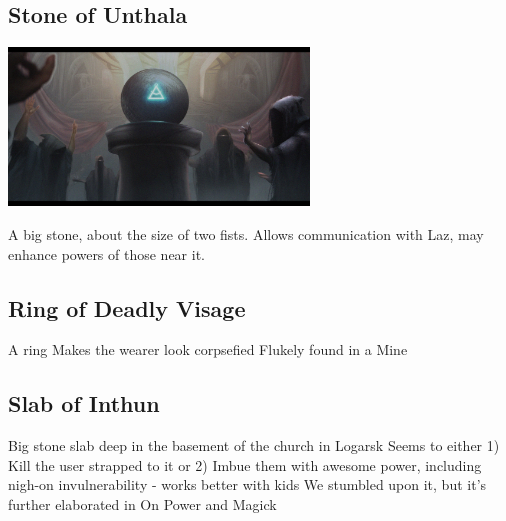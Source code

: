 \smallskip

\subsection*{Stone of Unthala} 

\begin{center}
\includegraphics[width=80mm]{./content/img/unthala1.jpg}
\begin{figure}[h]
\end{figure}
\end{center}

\noindent 

A big stone, about the size of two fists. Allows communication with Laz, may enhance powers of those near it.

\smallskip

\subsection*{Ring of Deadly Visage} 

\noindent 

A ring 	Makes the wearer look corpsefied 	Flukely found in a Mine

\smallskip

\subsection*{Slab of Inthun} 

\noindent 

Big stone slab deep in the basement of the church in Logarsk 	Seems to either 1) Kill the user strapped to it or 2) Imbue them with awesome power, including nigh-on invulnerability - works better with kids 	We stumbled upon it, but it's further elaborated in On Power and Magick

